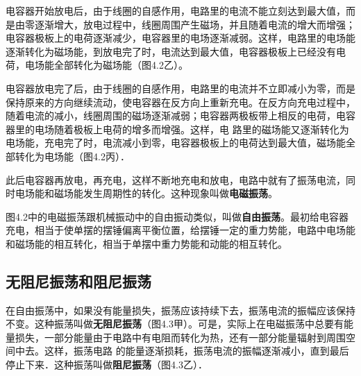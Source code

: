 电容器开始放电后，由于线圈的自感作用，电路里的电流不能立刻达到最大值，而是由零逐渐增大，放电过程中，线圈周围产生磁场，并且随着电流的增大而增强；电容器极板上的电荷逐渐减少，电容器里的电场逐渐减弱。这样，电路里的电场能逐渐转化为磁场能，到放电完了时，电流达到最大值，电容器极板上已经没有电荷，电场能全部转化为磁场能（图4.2乙）。


电容器放电完了后，由于线圈的自感作用，电路里的电流并不立即减小为零，而是保持原来的方向继续流动，使电容器在反方向上重新充电。在反方向充电过程中，随着电流的减小，线圈周围的磁场逐渐减弱；电容器两极板带上相反的电荷，电容器里的电场随着极板上电荷的增多而增强。这样，电
路里的磁场能又逐渐转化为电场能，充电完了时，电流减小到零，电容器极板上的电荷达到最大值，磁场能全部转化为电场能（图4.2丙）．

此后电容器再放电，再充电，这样不断地充电和放电，电路中就有了振荡电流，同时电场能和磁场能发生周期性的转化。这种现象叫做\textbf{电磁振荡}。

图4.2中的电磁振荡跟机械振动中的自由振动类似，叫做\textbf{自由振荡}。最初给电容器充电，相当于使单摆的摆锤偏离平衡位置，给摆锤一定的重力势能，电路中电场能和磁场能的相互转化，相当于单摆中重力势能和动能的相互转化。

\subsection{无阻尼振荡和阻尼振荡}

在自由振荡中，如果没有能量损失，振荡应该持续下去，振荡电流的振幅应该保持不变。这种振荡叫做\textbf{无阻尼振荡}（图4.3甲）。可是，实际上在电磁振荡中总要有能量损失，一部分能量由于电路中有电阻而转化为热，还有一部分能量辐射到周围空间中去。这样，振荡电路
的能量逐渐损耗，振荡电流的振幅逐渐减小，直到最后停止下来．这种振荡叫做\textbf{阻尼振荡}（图4.3乙）．
\begin{figure}[htp]\centering
{}

\caption{}
\end{figure}

